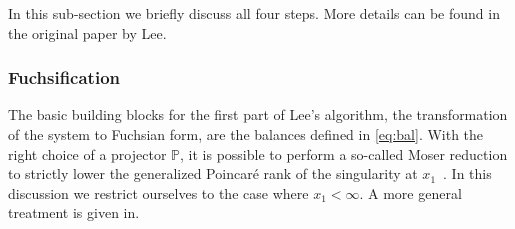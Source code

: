 \documentclass[12pt]{article}
\numberwithin{equation}{section}
\numberwithin{figure}{section}
\renewcommand{\P}{\mathds{P}}
\begin{document}
      In this sub-section we briefly discuss all four steps.
      More details can be found in the original paper by Lee\cite{Lee:2014ioa}.

      \subsubsection*{Fuchsification}
        The basic building blocks for the first part of Lee's algorithm, the transformation of the system to Fuchsian form, are the balances defined in \eqref{eq:bal}.
        With the right choice of a projector $\P$, it is possible to perform a so-called Moser reduction to strictly lower the generalized Poincar\'{e} rank of the singularity at $x_1$~\cite{Moser:1959}.
        In this discussion we restrict ourselves to the case where $x_1<\infty$.
        A more general treatment is given in\cite{Lee:2014ioa}.
        
\end{document}
